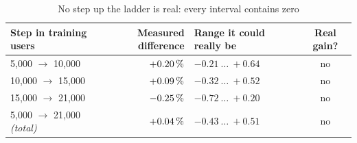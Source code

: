 \begin{table}[H]
\centering\small
\caption{No step up the ladder is real: every interval contains zero}
\label{tab:bootstrap}
\begin{tabular}{@{}lrlc@{}}
\toprule
\textbf{Step in training users} & \textbf{Measured difference} & \textbf{Range it could really be} & \textbf{Real gain?} \\
\midrule
5{,}000 $\rightarrow$ 10{,}000  & $+0.20\,\%$ & $-0.21 \ \ldots \ +0.64$ & no \\
10{,}000 $\rightarrow$ 15{,}000 & $+0.09\,\%$ & $-0.32 \ \ldots \ +0.52$ & no \\
15{,}000 $\rightarrow$ 21{,}000 & $-0.25\,\%$ & $-0.72 \ \ldots \ +0.20$ & no \\
\midrule
5{,}000 $\rightarrow$ 21{,}000 \textit{(total)} & $+0.04\,\%$ & $-0.43 \ \ldots \ +0.51$ & no \\
\bottomrule
\end{tabular}

\end{table}
